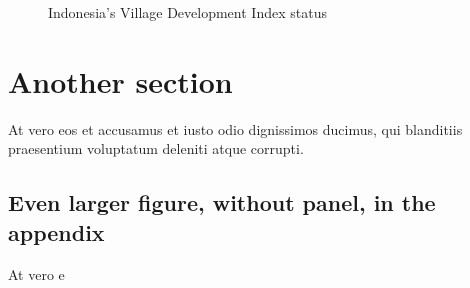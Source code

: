 \documentclass[letterpaper,12pt,leqno]{article}
\begin{document}
\begin{figure}[h]
\hfill
{}
\caption{Indonesia's Village Development Index status}
\label{f:1}\end{figure}
 


\section{Another section}\label{a:appendix2}

At vero eos et accusamus et iusto odio dignissimos ducimus, qui blanditiis praesentium voluptatum deleniti atque corrupti.

\subsection{Even larger figure, without panel, in the appendix} 

At vero e
\end{document}
